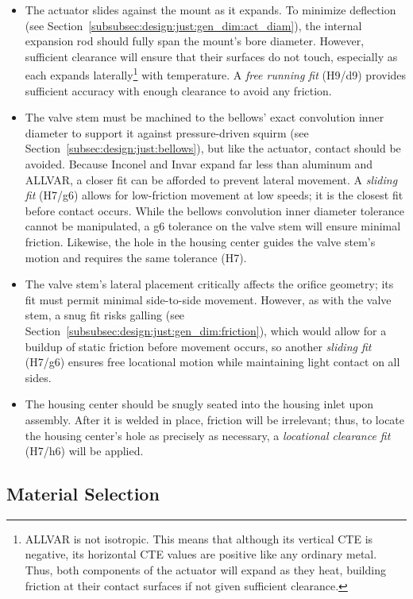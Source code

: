 \documentclass[12pt, letterpaper]{report}%
\newcounter{mycounter}           %
\newcounter{sub}[mycounter]      %
\begin{document}
			\begin{itemize}
				\item The actuator slides against the mount as it expands. To minimize deflection (see Section~\ref{subsubsec:design:just:gen_dim:act_diam}), the internal expansion rod should fully span the mount's bore diameter.
					However, sufficient clearance will ensure that their surfaces do not touch, especially as each expands laterally\footnote{ALLVAR is not isotropic. This means that although its vertical CTE is negative, its horizontal CTE values are positive like any ordinary metal. Thus, both components of the actuator will expand as they heat, building friction at their contact surfaces if not given sufficient clearance.}
					with temperature. A \textit{free running fit} (H9/d9) provides sufficient accuracy with enough clearance to avoid any friction.
				\item The valve stem must be machined to the bellows' exact convolution inner diameter to support it against pressure-driven squirm (see Section~\ref{subsec:design:just:bellows}), but like the actuator, contact should be avoided.
					Because Inconel and Invar expand far less than aluminum and ALLVAR, a closer fit can be afforded to prevent lateral movement.
					A \textit{sliding fit} (H7/g6) allows for low-friction movement at low speeds; it is the closest fit before contact occurs.
					While the bellows convolution inner diameter tolerance cannot be manipulated, a g6 tolerance on the valve stem will ensure minimal friction.
					Likewise, the hole in the housing center guides the valve stem's motion and requires the same tolerance (H7).
				\item The valve stem's lateral placement critically affects the orifice geometry; its fit must permit minimal side-to-side movement. However, as with the valve stem, a snug fit risks galling (see Section~\ref{subsubsec:design:just:gen_dim:friction}), which would allow for a buildup of static friction before movement occurs,
					so another \textit{sliding fit} (H7/g6) ensures free locational motion while maintaining light contact on all sides.
				\item The housing center should be snugly seated into the housing inlet upon assembly.
					After it is welded in place, friction will be irrelevant; thus, to locate the housing center's hole as precisely as necessary, a \textit{locational clearance fit} (H7/h6) will be applied.
			\end{itemize}

		\subsection{Material Selection}
		\label{subsec:design:just:mat}
\end{document}
